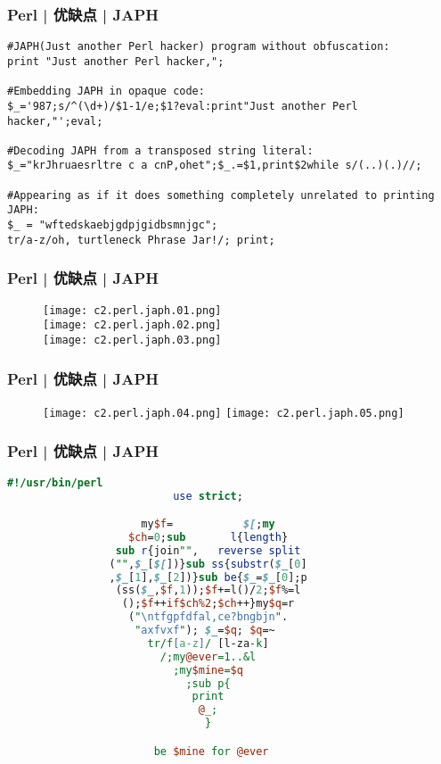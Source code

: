 \begin{frame}[fragile]
  \frametitle{Perl | 优缺点 | JAPH}
\begin{lstlisting}[basicstyle=\small\tt]
#JAPH(Just another Perl hacker) program without obfuscation:
print "Just another Perl hacker,";

#Embedding JAPH in opaque code:
$_='987;s/^(\d+)/$1-1/e;$1?eval:print"Just another Perl hacker,"';eval;

#Decoding JAPH from a transposed string literal:
$_="krJhruaesrltre c a cnP,ohet";$_.=$1,print$2while s/(..)(.)//;

#Appearing as if it does something completely unrelated to printing JAPH:
$_ = "wftedskaebjgdpjgidbsmnjgc";
tr/a-z/oh, turtleneck Phrase Jar!/; print;
\end{lstlisting}
\end{frame}

\begin{frame}
  \frametitle{Perl | 优缺点 | JAPH}
  \begin{figure}
    \centering
    \texttt{[image: c2.perl.japh.01.png]}\\
    \vspace{1em}
    \texttt{[image: c2.perl.japh.02.png]}\\
    \vspace{1em}
    \texttt{[image: c2.perl.japh.03.png]}
  \end{figure}
\end{frame}

\begin{frame}
  \frametitle{Perl | 优缺点 | JAPH}
  \begin{figure}
    \centering
    \texttt{[image: c2.perl.japh.04.png]}
    \quad
    \texttt{[image: c2.perl.japh.05.png]}
  \end{figure}
\end{frame}

\begin{frame}[fragile]
  \frametitle{Perl | 优缺点 | JAPH}
  \begin{lstlisting}[language=Perl,basicstyle=\scriptsize\tt]
                        #!/usr/bin/perl
                          use strict;

                     my$f=           $[;my
                   $ch=0;sub       l{length}
                 sub r{join"",   reverse split
                ("",$_[$[])}sub ss{substr($_[0]
                ,$_[1],$_[2])}sub be{$_=$_[0];p
                 (ss($_,$f,1));$f+=l()/2;$f%=l 
                  ();$f++if$ch%2;$ch++}my$q=r
                   ("\ntfgpfdfal,ce?bngbjn".    
                    "axfvxf"); $_=$q; $q=~
                      tr/f[a-z]/ [l-za-k]
                        /;my@ever=1..&l
                          ;my$mine=$q
                            ;sub p{
                             print
                              @_;
                               }

                       be $mine for @ever
\end{lstlisting} 
\end{frame}

